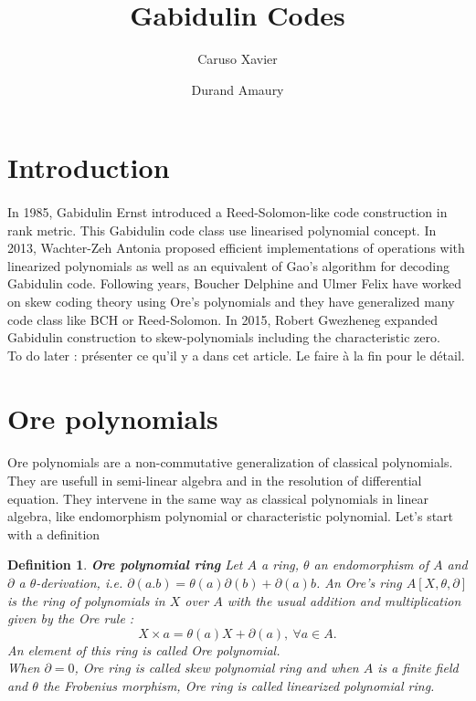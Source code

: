 \documentclass[a4paper]{llncs}
\author{Caruso Xavier \and Durand Amaury}
\institute{ Instistute : to do}
\title{Gabidulin Codes}
\newtheorem{defn}[thm]{Definition}
\begin{document}
\maketitle

\section{Introduction}
\paragraph{}
In 1985, Gabidulin Ernst introduced a Reed-Solomon-like code construction in rank metric. This Gabidulin code class use linearised polynomial concept. In 2013, Wachter-Zeh Antonia proposed efficient implementations of operations with linearized polynomials as well as an equivalent of Gao's algorithm for decoding Gabidulin code. Following years, Boucher Delphine and Ulmer Felix have worked on skew coding theory using Ore's polynomials and they have generalized many code class like BCH or Reed-Solomon. In 2015, Robert Gwezheneg expanded Gabidulin construction to skew-polynomials including the characteristic zero. \\

To do later : présenter ce qu'il y a dans cet article. Le faire à la fin pour le détail. \\

\section{Ore polynomials}
\paragraph{}
Ore polynomials are a non-commutative generalization of classical polynomials. They are usefull in semi-linear algebra and in the resolution of differential equation. They intervene in the same way as classical polynomials in linear algebra, like endomorphism polynomial or characteristic polynomial. Let's start with a definition 

\begin{defn} {\textbf{Ore polynomial ring}}
Let $A$ a ring, $\theta$ an endomorphism of $A$ and $\partial$ a $\theta$-derivation, i.e. $\partial(a.b) = \theta(a)\partial(b) + \partial(a)b$. An Ore's ring $A[X, \theta, \partial]$ is the ring of polynomials in $X$ over $A$ with the usual addition and multiplication given by the Ore rule : $$X \times a = \theta(a)X + \partial(a),\ \forall a \in A.$$ 
An element of this ring is called Ore polynomial. \\
When $\partial = 0$, Ore ring is called skew polynomial ring and when $A$ is a finite field and $\theta$ the Frobenius morphism, Ore ring is called linearized polynomial ring.
\end{defn}
\end{document}
